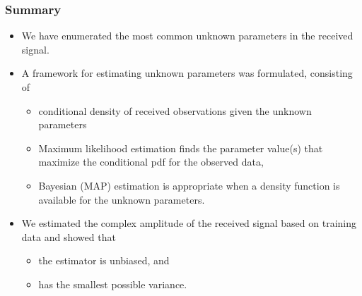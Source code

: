 \begin{frame}
  \frametitle{Summary}
  \begin{itemize}
  \item We have enumerated the most common unknown parameters in the
    received signal.
  \item A framework for estimating unknown parameters was formulated,
    consisting of
    \begin{itemize}
    \item conditional density of received observations given the
      unknown parameters
    \item Maximum likelihood estimation finds the parameter value(s)
      that maximize the conditional pdf for the observed data,
    \item Bayesian (MAP) estimation is appropriate when a density
      function is available for the unknown parameters.
    \end{itemize}
    \item We estimated the complex amplitude of the received signal
      based on training data and showed that
      \begin{itemize}
      \item the estimator is unbiased, and
      \item has the smallest possible variance.
      \end{itemize}
  \end{itemize}
\end{frame}